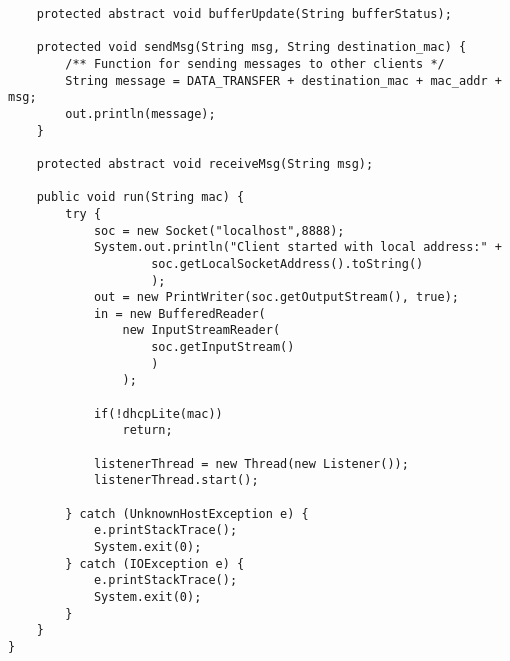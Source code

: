 \begin{verbatim}
	protected abstract void bufferUpdate(String bufferStatus);

	protected void sendMsg(String msg, String destination_mac) {
		/** Function for sending messages to other clients */
		String message = DATA_TRANSFER + destination_mac + mac_addr + msg;
		out.println(message);
	}

	protected abstract void receiveMsg(String msg);
	
	public void run(String mac) {
		try {
			soc = new Socket("localhost",8888);
			System.out.println("Client started with local address:" +
					soc.getLocalSocketAddress().toString()
					);
			out = new PrintWriter(soc.getOutputStream(), true);
			in = new BufferedReader(
				new InputStreamReader(
					soc.getInputStream()
					)
				);

			if(!dhcpLite(mac))
				return;	
			
			listenerThread = new Thread(new Listener());
			listenerThread.start();

		} catch (UnknownHostException e) {
			e.printStackTrace();
			System.exit(0);
		} catch (IOException e) {
			e.printStackTrace();
			System.exit(0);
		}
	}
}
\end{verbatim}
